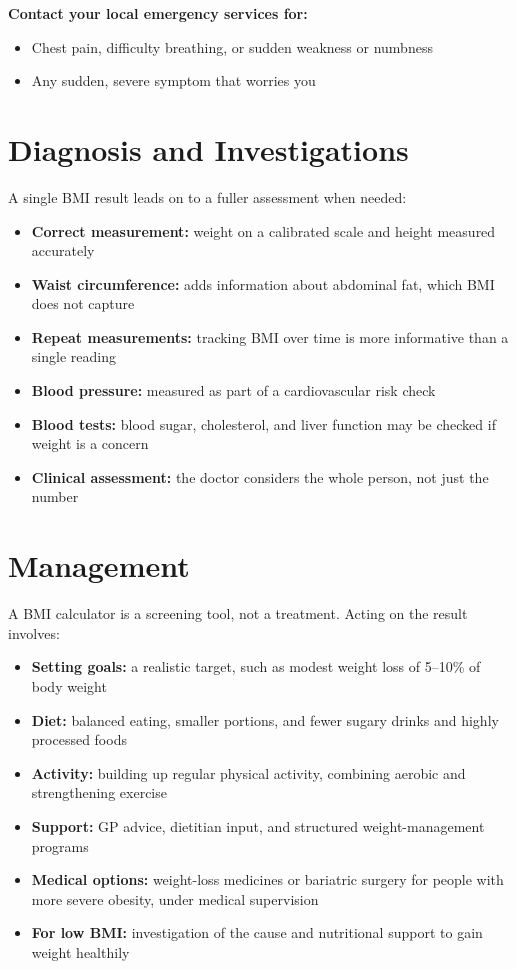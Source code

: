 \textbf{Contact your local emergency services for:}
\begin{itemize}
    \item Chest pain, difficulty breathing, or sudden weakness or numbness
    \item Any sudden, severe symptom that worries you
\end{itemize}

\section*{Diagnosis and Investigations}
A single BMI result leads on to a fuller assessment when needed:

\begin{itemize}
    \item \textbf{Correct measurement:} weight on a calibrated scale and height measured accurately
    \item \textbf{Waist circumference:} adds information about abdominal fat, which BMI does not capture
    \item \textbf{Repeat measurements:} tracking BMI over time is more informative than a single reading
    \item \textbf{Blood pressure:} measured as part of a cardiovascular risk check
    \item \textbf{Blood tests:} blood sugar, cholesterol, and liver function may be checked if weight is a concern
    \item \textbf{Clinical assessment:} the doctor considers the whole person, not just the number
\end{itemize}

\section*{Management}
A BMI calculator is a screening tool, not a treatment. Acting on the result involves:

\begin{itemize}
    \item \textbf{Setting goals:} a realistic target, such as modest weight loss of 5--10\% of body weight
    \item \textbf{Diet:} balanced eating, smaller portions, and fewer sugary drinks and highly processed foods
    \item \textbf{Activity:} building up regular physical activity, combining aerobic and strengthening exercise
    \item \textbf{Support:} GP advice, dietitian input, and structured weight-management programs
    \item \textbf{Medical options:} weight-loss medicines or bariatric surgery for people with more severe obesity, under medical supervision
    \item \textbf{For low BMI:} investigation of the cause and nutritional support to gain weight healthily
\end{itemize}


